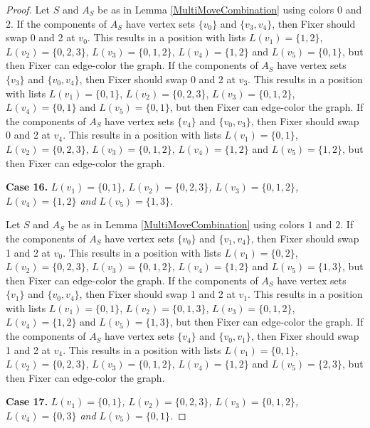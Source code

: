 \documentclass[12pt]{amsart}
\theoremstyle{plain}
\theoremstyle{definition}
\theoremstyle{remark}
\begin{document}
\begin{proof}
Let $S$ and $A_S$ be as in Lemma \ref{MultiMoveCombination} using colors $0$ and $2$. If the components of $A_S$ have vertex sets $\{v_0\}$ and $\{v_3, v_4\}$, then Fixer should swap 0 and 2 at $v_0$. This results in a position with lists $L(v_1) = \{1, 2\}$, $L(v_2) = \{0, 2, 3\}$, $L(v_3) = \{0, 1, 2\}$, $L(v_4) = \{1, 2\}$ and $L(v_5) = \{0, 1\}$, but then Fixer can edge-color the graph.
If the components of $A_S$ have vertex sets $\{v_3\}$ and $\{v_0, v_4\}$, then Fixer should swap 0 and 2 at $v_3$. This results in a position with lists $L(v_1) = \{0, 1\}$, $L(v_2) = \{0, 2, 3\}$, $L(v_3) = \{0, 1, 2\}$, $L(v_4) = \{0, 1\}$ and $L(v_5) = \{0, 1\}$, but then Fixer can edge-color the graph.
If the components of $A_S$ have vertex sets $\{v_4\}$ and $\{v_0, v_3\}$, then Fixer should swap 0 and 2 at $v_4$. This results in a position with lists $L(v_1) = \{0, 1\}$, $L(v_2) = \{0, 2, 3\}$, $L(v_3) = \{0, 1, 2\}$, $L(v_4) = \{1, 2\}$ and $L(v_5) = \{1, 2\}$, but then Fixer can edge-color the graph.

\noindent\textbf{Case 16.  }\textit{$L(v_1) = \{0, 1\}$, $L(v_2) = \{0, 2, 3\}$, $L(v_3) = \{0, 1, 2\}$, $L(v_4) = \{1, 2\}$ and $L(v_5) = \{1, 3\}$.}

Let $S$ and $A_S$ be as in Lemma \ref{MultiMoveCombination} using colors $1$ and $2$. If the components of $A_S$ have vertex sets $\{v_0\}$ and $\{v_1, v_4\}$, then Fixer should swap 1 and 2 at $v_0$. This results in a position with lists $L(v_1) = \{0, 2\}$, $L(v_2) = \{0, 2, 3\}$, $L(v_3) = \{0, 1, 2\}$, $L(v_4) = \{1, 2\}$ and $L(v_5) = \{1, 3\}$, but then Fixer can edge-color the graph.
If the components of $A_S$ have vertex sets $\{v_1\}$ and $\{v_0, v_4\}$, then Fixer should swap 1 and 2 at $v_1$. This results in a position with lists $L(v_1) = \{0, 1\}$, $L(v_2) = \{0, 1, 3\}$, $L(v_3) = \{0, 1, 2\}$, $L(v_4) = \{1, 2\}$ and $L(v_5) = \{1, 3\}$, but then Fixer can edge-color the graph.
If the components of $A_S$ have vertex sets $\{v_4\}$ and $\{v_0, v_1\}$, then Fixer should swap 1 and 2 at $v_4$. This results in a position with lists $L(v_1) = \{0, 1\}$, $L(v_2) = \{0, 2, 3\}$, $L(v_3) = \{0, 1, 2\}$, $L(v_4) = \{1, 2\}$ and $L(v_5) = \{2, 3\}$, but then Fixer can edge-color the graph.

\noindent\textbf{Case 17.  }\textit{$L(v_1) = \{0, 1\}$, $L(v_2) = \{0, 2, 3\}$, $L(v_3) = \{0, 1, 2\}$, $L(v_4) = \{0, 3\}$ and $L(v_5) = \{0, 1\}$.}


\end{proof}
\end{document}
